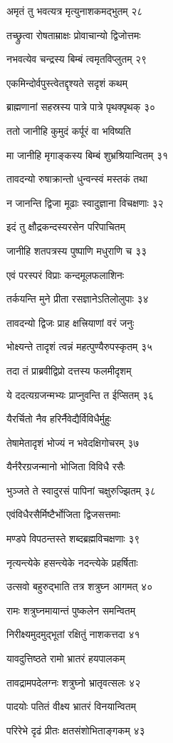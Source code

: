 अमृतं तु भवत्यत्र मृत्युनाशकमद्भुतम् २८

तच्छ्रुत्वा रोषताम्राक्षः प्रोवाचान्यो द्विजोत्तमः

नभवत्येव चन्द्रस्य बिम्बं त्वमृतविप्लुतम् २९

एकमिन्दोर्वपुस्त्वेतद्दृश्यते सदृशं कथम्

ब्राह्मणानां सहस्रस्य पात्रे पात्रे पृथक्पृथक् ३०

ततो जानीहि कुमुदं कर्पूरं वा भविष्यति

मा जानीहि मृगाङ्कस्य बिम्बं शुभ्रश्रियान्वितम् ३१

तावदन्यो रुषाक्रान्तो धुन्वन्स्वं मस्तकं तथा

न जानन्ति द्विजा मूढाः स्वादुज्ञाना विचक्षणाः ३२

इदं तु क्षौद्रकन्दस्यरसेन परिपाचितम्

जानीहि शतपत्रस्य पुष्पाणि मधुराणि च ३३

एवं परस्परं विप्राः कन्दमूलफलाशिनः

तर्कयन्ति मुने प्रीता रसज्ञानेऽतिलोलुपाः ३४

तावदन्यो द्विजः प्राह क्षत्त्रियाणां वरं जनुः

भोक्ष्यन्ते तादृशं त्वन्नं महत्पुण्यैरुपस्कृतम् ३५

तदा तं प्राब्रवीद्विप्रो दत्तस्य फलमीदृशम्

ये ददत्यग्रजन्मभ्यः प्राप्नुवन्ति त ईप्सितम् ३६

यैरर्चितो नैव हरिर्नैवेद्यैर्विविधैर्मुहुः

तेषामेतादृशं भोज्यं न भवेदक्षिगोचरम् ३७

यैर्नरैरग्रजन्मानो भोजिता विविधै रसैः

भुञ्जते ते स्वादुरसं पापिनां चक्षुरुज्झितम् ३८

एवंविधैरसैर्मिष्टैर्भोजिता द्विजसत्तमाः

मण्डपे विपठन्तस्ते शब्दब्रह्मविचक्षणाः ३९

नृत्यन्त्येके हसन्त्येके नदन्त्येके प्रहर्षिताः

उत्सवो बहुरुद्भाति तत्र शत्रुघ्न आगमत् ४०

रामः शत्रुघ्नमायान्तं पुष्कलेन समन्वितम्

निरीक्ष्यमुदमुद्भूतां रक्षितुं नाशकत्तदा ४१

यावदुत्तिष्ठते रामो भ्रातरं हयपालकम्

तावद्रामपदेलग्नः शत्रुघ्नो भ्रातृवत्सलः ४२

पादयोः पतितं वीक्ष्य भ्रातरं विनयान्वितम्

परिरेभे दृढं प्रीतः क्षतसंशोभिताङ्गकम् ४३


